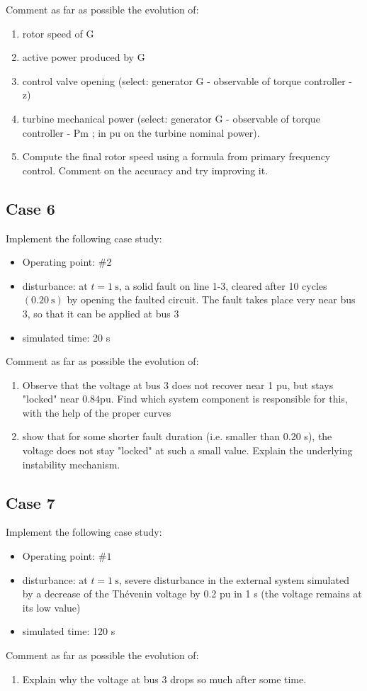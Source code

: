\documentclass[a4paper,11pt,oneside,onecolumn]{article}
\begin{document}
\noindent Comment as far as possible the evolution of:
\begin{enumerate}
\item rotor speed of G
\item active power produced by G
\item control valve opening (select: generator G - observable of torque controller - z)
\item turbine mechanical power (select: generator G - observable of torque controller - Pm ; in pu on the turbine nominal power).	
\item Compute the final rotor speed using a formula from primary frequency control. Comment on the accuracy and try improving it.
\end{enumerate}



\subsection{Case 6}

Implement the following case study:
\begin{itemize}
\item Operating point: \#2
\item disturbance: at $t=1 \mathrm{~s}$, a solid fault on line 1-3, cleared after 10 cycles $(0.20 \mathrm{~s})$ by opening the faulted circuit. The fault takes place very near bus 3, so that it can be applied at bus 3
\item simulated time: 20 s 
\end{itemize}

\noindent Comment as far as possible the evolution of:
\begin{enumerate}
\item Observe that the voltage at bus 3 does not recover near 1 pu, but stays "locked" near $0.84 \mathrm{pu}$. Find which system component is responsible for this, with the help of the proper curves
\item show that for some shorter fault duration (i.e. smaller than 0.20 s), the voltage does not stay "locked" at such a small value. Explain the underlying instability mechanism.	
\end{enumerate}

\subsection{Case 7}

Implement the following case study:
\begin{itemize}
\item Operating point: $\# 1$
\item disturbance: at $t=1 \mathrm{~s}$, severe disturbance in the external system simulated by a decrease of the Thévenin voltage by 0.2 pu in 1 s (the voltage remains at its low value)
\item simulated time: 120 s
\end{itemize}

\noindent Comment as far as possible the evolution of:
\begin{enumerate}
\item Explain why the voltage at bus 3 drops so much after some time.
\end{enumerate}
\end{document}

